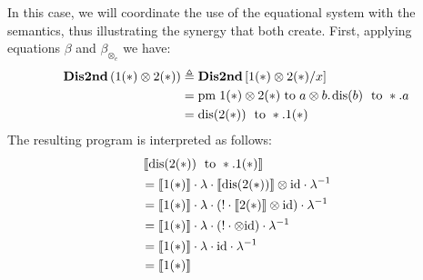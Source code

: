 \begin{example}
   \begin{comment}
     &  \textbf{Dis1stOR2nd} \triangleq - \triangleright  \lambda y: N \otimes N . \, 
\text{case } \text{inl} (*) \,  
  \left\{
    \begin{aligned} 
    &\inl_{\typeB}(w) \Rightarrow  \textbf{Dis1st} \, x; \\
    &\inr_{\typeB}(z) \Rightarrow  \textbf{Dis2nd} \, x   \\ 
  \end{aligned}  
  \right\} : N \otimes N \multimap N  & \\
  & \textbf{Dis1stOR2nd} \, (1 (*) \otimes 2(*)) : N 
    \end{comment}

  In this case, we will coordinate the use of the equational system with the semantics, thus illustrating the synergy that both create. First, applying equations $\beta$ and $\beta_{\otimes_e}$ we have:
   \begin{equation*}
    \begin{split}
    \textbf{Dis2nd} \,(1 (*) \otimes 2(*)) & \triangleq \textbf{Dis2nd} \,[1 (*) \otimes 2(*)/x] \\
    & = \text{pm} \hspace{3 pt}  1 (*) \otimes 2(*) \hspace{3 pt} \text{to} \hspace{3 pt} a \otimes b. \hspace{1 pt} \text{dis}(b) \hspace{3 pt} \text{ to } *.a \\
    & = \text{dis}(2(*)) \hspace{3 pt} \text{ to } *. 1 (*) 
\end{split}
   \end{equation*}
    The resulting program is interpreted as follows:
    \begin{align*}
   &  \left \llbracket  \text{dis}(2(*)) \hspace{3 pt} \text{ to } *. 1 (*) \right \rrbracket \\
    & = \llbracket 1(*) \rrbracket \cdot \lambda \cdot \left \llbracket \text{dis}(2(*)) \right \rrbracket \otimes \mathrm{id} \cdot  \lambda^{-1}  \\
   &  =  \llbracket 1(*) \rrbracket \cdot \lambda \cdot (! \cdot \llbracket 2(*) \rrbracket \otimes \mathrm{id}) \cdot \lambda^{-1} \\
   &  =  \llbracket 1(*) \rrbracket \cdot \lambda \cdot (! \cdot \otimes \mathrm{id}) \cdot \lambda^{-1} \\
   & = \llbracket 1(*) \rrbracket \cdot   \lambda \cdot  \mathrm{id} \cdot  \lambda^{-1} \\
   & =  \llbracket 1(*) \rrbracket 
   \end{align*}

   
\end{example}


